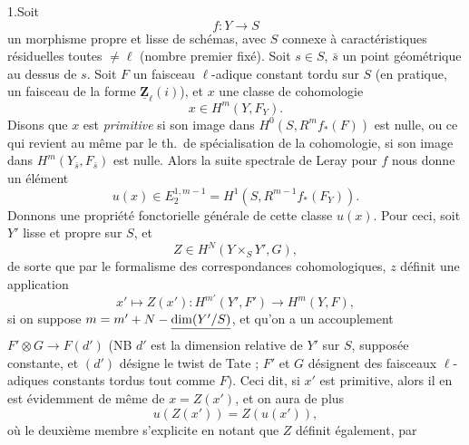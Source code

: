 \documentclass[11pt,a4paper]{article}
\begin{document}


1.\quad Soit
\[ f\colon Y \longrightarrow S \]
un morphisme propre et lisse de schémas, avec $S$  connexe à
caractéristiques résiduelles toutes $\neq \ell$ (nombre premier fixé). Soit $s \in S$, $\bar{s}$ un point
géométrique au dessus de $s$. Soit $F$ un faisceau $\ell$-adique constant tordu sur
$S$ (en pratique, un faisceau de la forme $\underline{\mathbf{Z}}_\ell(i)$), et $x$
une classe de cohomologie
\[ x \in H^m(Y, F_Y) . \]
Disons que $x$ est \emph{primitive} si son image dans $H^0(S, R^m f_{*}(F))$ est
nulle, ou ce qui revient au même par le th.\ de spécialisation de la cohomologie,
si son image dans $H^m(Y_{\bar s}, F_{\bar s})$ est nulle. Alors la suite spectrale de Leray pour $f$ nous donne un
élément
\[ u(x) \in E_2^{1,m-1} = H^1(S, R^{m-1} f_{*}(F_Y)) . \]
Donnons une propriété fonctorielle générale de cette classe $u(x)$. Pour ceci, soit
$Y'$ lisse et propre sur $S$, et
\[ Z \in H^N(Y \times_S Y', G), \]
de sorte que par le formalisme des correspondances cohomologiques, $z$ définit une
application
\[ x' \longmapsto Z(x')\colon H^{m'}(Y', F') \longrightarrow H^m(Y, F), \]
si on suppose $m = m' + N - \struck{\dim(Y'/S)}$, et qu'on a un
accouplement $F' \otimes G \to F(d')$ (NB $d'$ est la dimension relative de $Y'$ sur $S$,
supposée constante, et $(d')$ désigne le twist de Tate ; $F'$ et $G$ désignent des
faisceaux $\ell$-adiques constants tordus  tout comme $F$). Ceci dit, si $x'$ est primitive, alors il en est
évidemment de même de $x = Z(x')$, et on aura de plus
\[ u(Z(x')) = Z(u(x')) , \]
où le deuxième membre s'explicite en notant que $Z$ définit également, par
\end{document}
